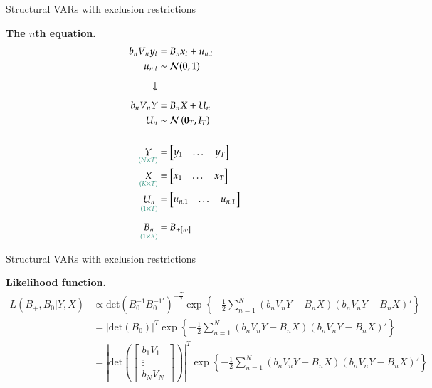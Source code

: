 \documentclass[notes,blackandwhite,mathsans,usenames,dvipsnames]{beamer}
\begin{document}
\begin{frame}{Structural VARs with exclusion restrictions}

\bigskip\textbf{The $n$th equation.}
\begin{align*}
b_nV_ny_t &= B_n x_t + u_{n.t}\\
u_{n.t} &\sim\mathcal{N}(0,1)\\[1ex]
\downarrow&\\[1ex]
b_nV_nY &= B_n X + U_n\\
U_n &\sim\mathcal{N}\left(\mathbf{0}_T,I_T\right)\\[3ex]
\underset{\color{mcxs2}(N\times T)}{Y}  &= \begin{bmatrix} y_1 & \dots & y_T \end{bmatrix}\\
\underset{\color{mcxs2}(K\times T)}{X}  &= \begin{bmatrix} x_1 & \dots & x_T \end{bmatrix}\\
\underset{\color{mcxs2}(1\times T)}{U_n}  &= \begin{bmatrix} u_{n.1} & \dots & u_{n.T} \end{bmatrix}\\[1ex]
\underset{\color{mcxs2}(1\times K)}{B_n} &= B_{+[n\cdot]}
\end{align*}

\end{frame}



\begin{frame}{Structural VARs with exclusion restrictions}

\textbf{Likelihood function.}\scriptsize
\begin{align*}
L(B_+,B_0|Y,X) &\propto \text{det}\left( B_0^{-1}B_0^{-1\prime} \right)^{-\frac{T}{2}}\exp\left\{ -\frac{1}{2}\sum_{n=1}^N (b_nV_nY - B_n X)(b_nV_nY - B_n X)' \right\}\\
&= |\text{det}\left( B_0 \right)|^{T}\exp\left\{ -\frac{1}{2}\sum_{n=1}^N (b_nV_nY - B_n X)(b_nV_nY - B_n X)' \right\}\\
&= \left|\text{det}\left( \begin{bmatrix} b_1V_1\\ \vdots \\ b_NV_N \end{bmatrix} \right)\right|^{T}\exp\left\{ -\frac{1}{2}\sum_{n=1}^N (b_nV_nY - B_n X)(b_nV_nY - B_n X)' \right\}
\end{align*}

\end{frame}
\end{document}
